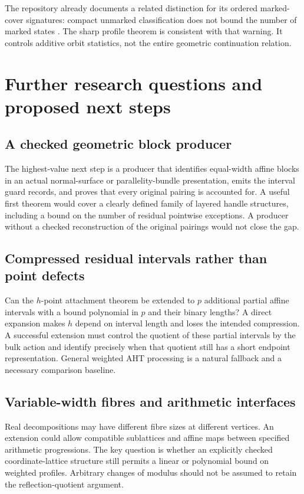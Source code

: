 \documentclass[11pt]{article}
\theoremstyle{definition}
\begin{document}
The repository already documents a related distinction for its ordered marked-cover signatures: compact unmarked classification does not bound the number of marked states \cite{repo-cover,repo-theory}. The sharp profile theorem is consistent with that warning. It controls additive orbit statistics, not the entire geometric continuation relation.

\section{Further research questions and proposed next steps}
\label{sec:future}

\subsection{A checked geometric block producer}
The highest-value next step is a producer that identifies equal-width affine blocks in an actual normal-surface or parallelity-bundle presentation, emits the interval guard records, and proves that every original pairing is accounted for. A useful first theorem would cover a clearly defined family of layered handle structures, including a bound on the number of residual pointwise exceptions. A producer without a checked reconstruction of the original pairings would not close the gap.

\subsection{Compressed residual intervals rather than point defects}
Can the $h$-point attachment theorem be extended to $p$ additional partial affine intervals with a bound polynomial in $p$ and their binary lengths? A direct expansion makes $h$ depend on interval length and loses the intended compression. A successful extension must control the quotient of these partial intervals by the bulk action and identify precisely when that quotient still has a short endpoint representation. General weighted AHT processing is a natural fallback and a necessary comparison baseline.

\subsection{Variable-width fibres and arithmetic interfaces}
Real decompositions may have different fibre sizes at different vertices. An extension could allow compatible sublattices and affine maps between specified arithmetic progressions. The key question is whether an explicitly checked coordinate-lattice structure still permits a linear or polynomial bound on weighted profiles. Arbitrary changes of modulus should not be assumed to retain the reflection-quotient argument.
\end{document}
